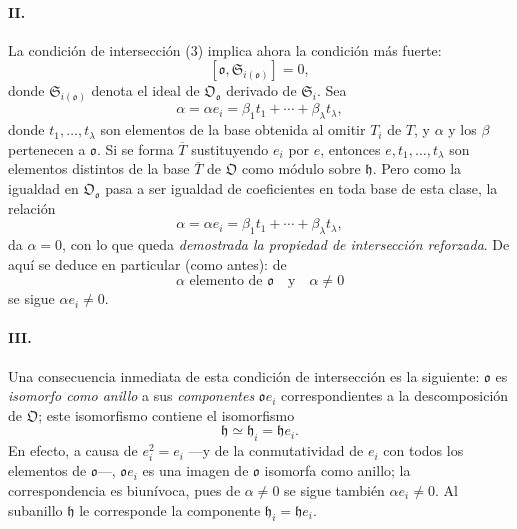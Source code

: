 \paragraph{II.}
La condición de intersección (3) implica ahora la condición más fuerte:
\[
[\mathfrak o,\mathfrak S_{i(\mathfrak o)}]=0,
\]
donde $\mathfrak S_{i(\mathfrak o)}$ denota el ideal de $\mathfrak O_{\mathfrak o}$ derivado de $\mathfrak S_i$. Sea
\[
\alpha=\alpha e_i=\beta_1t_1+\cdots+\beta_\lambda t_\lambda,
\]
donde $t_1,\ldots,t_\lambda$ son elementos de la base obtenida al omitir $T_i$ de $T$, y $\alpha$ y los $\beta$ pertenecen a $\mathfrak o$. Si se forma $\overline T$ sustituyendo $e_i$ por $e$, entonces $e,t_1,\ldots,t_\lambda$ son elementos distintos de la base $\overline T$ de $\mathfrak O$ como módulo sobre $\mathfrak h$. Pero como la igualdad en $\mathfrak O_{\mathfrak o}$ pasa a ser igualdad de coeficientes en toda base de esta clase, la relación
\[
\alpha=\alpha e_i=\beta_1t_1+\cdots+\beta_\lambda t_\lambda,
\]
da $\alpha=0$, con lo que queda \emph{demostrada la propiedad de intersección reforzada}. De aquí se deduce en particular (como antes): de
\[
\alpha\text{ elemento de }\mathfrak o\quad\text{y}\quad\alpha\ne0
\]
se sigue $\alpha e_i\ne0$.

\paragraph{III.}
Una consecuencia inmediata de esta condición de intersección es la siguiente: $\mathfrak o$ es \emph{isomorfo como anillo} a sus \emph{componentes} $\mathfrak o e_i$ correspondientes a la descomposición de $\mathfrak O$; este isomorfismo contiene el isomorfismo
\[
\mathfrak h\simeq\mathfrak h_i=\mathfrak h e_i.
\]
En efecto, a causa de $e_i^2=e_i$ ---y de la conmutatividad de $e_i$ con todos los elementos de $\mathfrak o$---, $\mathfrak o e_i$ es una imagen de $\mathfrak o$ isomorfa como anillo; la correspondencia es biunívoca, pues de $\alpha\ne0$ se sigue también $\alpha e_i\ne0$. Al subanillo $\mathfrak h$ le corresponde la componente $\mathfrak h_i=\mathfrak h e_i$.

